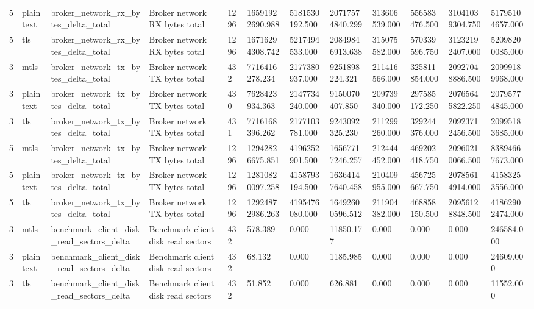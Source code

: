 \begin{longtable}{llllllllllll}
5 & plaintext & broker\_network\_rx\_bytes\_delta\_total & Broker network RX bytes total & 1296 & 16591922690.988 & 5181530192.500 & 20717574840.299 & 313606539.000 & 556583476.500 & 31041039304.750 & 51795104657.000 \\
5 & tls & broker\_network\_rx\_bytes\_delta\_total & Broker network RX bytes total & 1296 & 16716294308.742 & 5217494533.000 & 20849846913.638 & 315075582.000 & 570339596.750 & 31232192407.000 & 52098200085.000 \\
3 & mtls & broker\_network\_tx\_bytes\_delta\_total & Broker network TX bytes total & 432 & 7716416278.234 & 2177380937.000 & 9251898224.321 & 211416566.000 & 325811854.000 & 20927048886.500 & 20999189968.000 \\
3 & plaintext & broker\_network\_tx\_bytes\_delta\_total & Broker network TX bytes total & 430 & 7628423934.363 & 2147734240.000 & 9150070407.850 & 209739340.000 & 297585172.250 & 20765645822.250 & 20795774845.000 \\
3 & tls & broker\_network\_tx\_bytes\_delta\_total & Broker network TX bytes total & 431 & 7716168396.262 & 2177103781.000 & 9243092325.230 & 211299260.000 & 329244376.000 & 20923712456.500 & 20995183685.000 \\
5 & mtls & broker\_network\_tx\_bytes\_delta\_total & Broker network TX bytes total & 1296 & 12942826675.851 & 4196252901.500 & 16567717246.257 & 212444452.000 & 469202418.750 & 20960210066.500 & 83894667673.000 \\
5 & plaintext & broker\_network\_tx\_bytes\_delta\_total & Broker network TX bytes total & 1296 & 12810820097.258 & 4158793194.500 & 16364147640.458 & 210409955.000 & 456725667.750 & 20785614914.000 & 41583253556.000 \\
5 & tls & broker\_network\_tx\_bytes\_delta\_total & Broker network TX bytes total & 1296 & 12924872986.263 & 4195476080.000 & 16492600596.512 & 211904382.000 & 468858150.500 & 20956128848.500 & 41862902474.000 \\
3 & mtls & benchmark\_client\_disk\_read\_sectors\_delta & Benchmark client disk read sectors & 432 & 578.389 & 0.000 & 11850.177 & 0.000 & 0.000 & 0.000 & 246584.000 \\
3 & plaintext & benchmark\_client\_disk\_read\_sectors\_delta & Benchmark client disk read sectors & 432 & 68.132 & 0.000 & 1185.985 & 0.000 & 0.000 & 0.000 & 24609.000 \\
3 & tls & benchmark\_client\_disk\_read\_sectors\_delta & Benchmark client disk read sectors & 432 & 51.852 & 0.000 & 626.881 & 0.000 & 0.000 & 0.000 & 11552.000 \\

\end{longtable}
